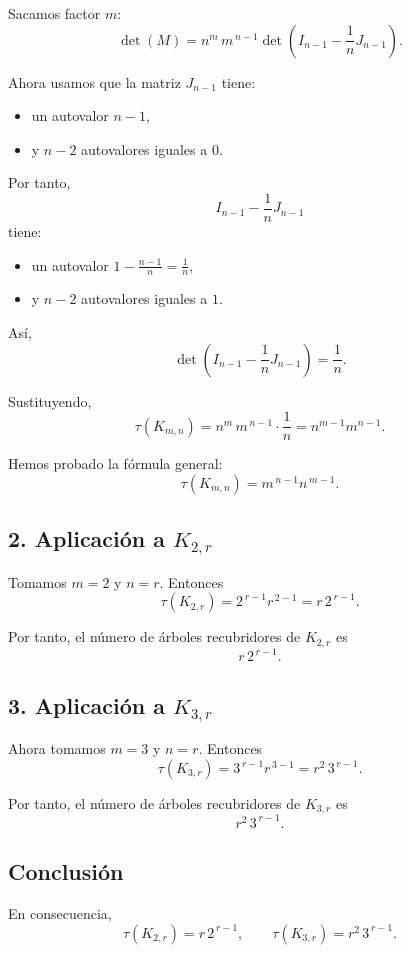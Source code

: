 \documentclass[12pt]{article}
\begin{document}
Sacamos factor \(m\):
\[
\det(M)=n^m\,m^{\,n-1}\det\!\left(I_{n-1}-\frac1n J_{n-1}\right).
\]

Ahora usamos que la matriz \(J_{n-1}\) tiene:
\begin{itemize}
    \item un autovalor \(n-1\),
    \item y \(n-2\) autovalores iguales a \(0\).
\end{itemize}
Por tanto,
\[
I_{n-1}-\frac1n J_{n-1}
\]
tiene:
\begin{itemize}
    \item un autovalor \(1-\frac{n-1}{n}=\frac1n\),
    \item y \(n-2\) autovalores iguales a \(1\).
\end{itemize}
Así,
\[
\det\!\left(I_{n-1}-\frac1n J_{n-1}\right)=\frac1n.
\]

Sustituyendo,
\[
\tau(K_{m,n})
=
n^m\,m^{\,n-1}\cdot \frac1n
=
n^{m-1}m^{n-1}.
\]

Hemos probado la fórmula general:
\[
\boxed{\tau(K_{m,n})=m^{\,n-1}n^{\,m-1}.}
\]

\subsection*{2. Aplicación a \(K_{2,r}\)}

Tomamos \(m=2\) y \(n=r\). Entonces
\[
\tau(K_{2,r})=2^{\,r-1}r^{\,2-1}=r\,2^{\,r-1}.
\]

Por tanto, el número de árboles recubridores de \(K_{2,r}\) es
\[
\boxed{r\,2^{\,r-1}.}
\]

\subsection*{3. Aplicación a \(K_{3,r}\)}

Ahora tomamos \(m=3\) y \(n=r\). Entonces
\[
\tau(K_{3,r})=3^{\,r-1}r^{\,3-1}=r^2\,3^{\,r-1}.
\]

Por tanto, el número de árboles recubridores de \(K_{3,r}\) es
\[
\boxed{r^2\,3^{\,r-1}.}
\]

\subsection*{Conclusión}

En consecuencia,
\[
\boxed{\tau(K_{2,r})=r\,2^{\,r-1}}, \qquad
\boxed{\tau(K_{3,r})=r^2\,3^{\,r-1}}.
\]
\end{document}
